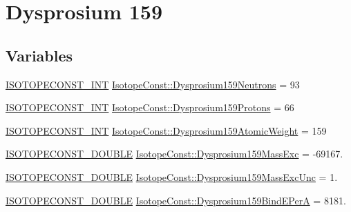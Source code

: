\hypertarget{group___isotope_const-_dysprosium-_dy159}{}\section{Dysprosium 159}
\label{group___isotope_const-_dysprosium-_dy159}
\subsection*{Variables}
\begin{DoxyCompactItemize}
\item 
\mbox{\hyperlink{group___isotope_const-_macros_ga5f18360b3e99483a35c32d789e62621c}{I\+S\+O\+T\+O\+P\+E\+C\+O\+N\+S\+T\+\_\+\+I\+NT}} \mbox{\hyperlink{group___isotope_const-_dysprosium-_dy159_ga5c4e0870447696bd35ce6b7a6cf46334}{Isotope\+Const\+::\+Dysprosium159\+Neutrons}} = 93
\item 
\mbox{\hyperlink{group___isotope_const-_macros_ga5f18360b3e99483a35c32d789e62621c}{I\+S\+O\+T\+O\+P\+E\+C\+O\+N\+S\+T\+\_\+\+I\+NT}} \mbox{\hyperlink{group___isotope_const-_dysprosium-_dy159_ga24c67bcb73e387e828ec18a04550b851}{Isotope\+Const\+::\+Dysprosium159\+Protons}} = 66
\item 
\mbox{\hyperlink{group___isotope_const-_macros_ga5f18360b3e99483a35c32d789e62621c}{I\+S\+O\+T\+O\+P\+E\+C\+O\+N\+S\+T\+\_\+\+I\+NT}} \mbox{\hyperlink{group___isotope_const-_dysprosium-_dy159_gaff8aedd9603ccb3895768f79e5c68c56}{Isotope\+Const\+::\+Dysprosium159\+Atomic\+Weight}} = 159
\item 
\mbox{\hyperlink{group___isotope_const-_macros_ga8f45a7272ce02c0b4c65c44636ed719a}{I\+S\+O\+T\+O\+P\+E\+C\+O\+N\+S\+T\+\_\+\+D\+O\+U\+B\+LE}} \mbox{\hyperlink{group___isotope_const-_dysprosium-_dy159_ga7ea56f66d9168132293f0ec5cca2db2e}{Isotope\+Const\+::\+Dysprosium159\+Mass\+Exc}} = -\/69167.
\item 
\mbox{\hyperlink{group___isotope_const-_macros_ga8f45a7272ce02c0b4c65c44636ed719a}{I\+S\+O\+T\+O\+P\+E\+C\+O\+N\+S\+T\+\_\+\+D\+O\+U\+B\+LE}} \mbox{\hyperlink{group___isotope_const-_dysprosium-_dy159_gad84fa78052c227895f49a33a83154117}{Isotope\+Const\+::\+Dysprosium159\+Mass\+Exc\+Unc}} = 1.
\item 
\mbox{\hyperlink{group___isotope_const-_macros_ga8f45a7272ce02c0b4c65c44636ed719a}{I\+S\+O\+T\+O\+P\+E\+C\+O\+N\+S\+T\+\_\+\+D\+O\+U\+B\+LE}} \mbox{\hyperlink{group___isotope_const-_dysprosium-_dy159_gab0f14cf30b8ea14ab2d30cb9a9eb6158}{Isotope\+Const\+::\+Dysprosium159\+Bind\+E\+PerA}} = 8181.

\end{DoxyCompactItemize}

